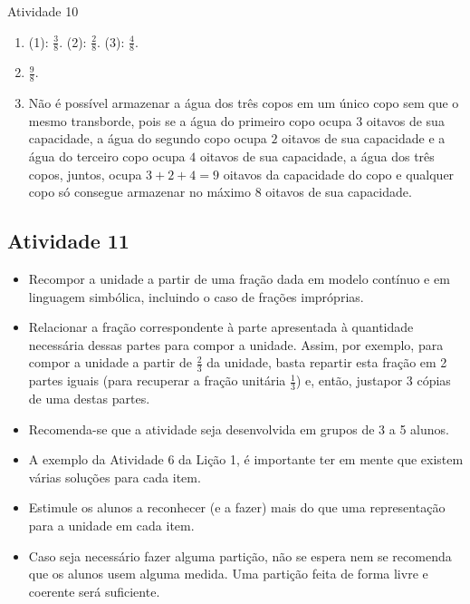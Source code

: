 \begin{multicols}{2}
\begin{resposta*}{Atividade 10}
\begin{enumerate} [\quad a)] %
    \item       (1):       $\frac{3}{8}$. (2):       $\frac{2}{8}$. (3):       $\frac{4}{8}$.
    \item             $\frac{9}{8}$.
    \item       Não é possível armazenar a água dos três copos em um único copo sem que o mesmo transborde, pois se a água do primeiro copo ocupa       $3$ oitavos de sua capacidade, a água do segundo copo ocupa       $2$ oitavos de sua capacidade e a água do terceiro copo ocupa       $4$ oitavos de sua capacidade, a água dos três copos, juntos, ocupa       $3 + 2 + 4 = 9$ oitavos da capacidade do copo e qualquer copo só consegue armazenar  no máximo $8$ oitavos de sua capacidade.
\end{enumerate} %

\end{resposta*}

\newpage

\subsection{Atividade 11}

   \vspace{.1cm}

  \begin{itemize} %
    \item       Recompor a unidade a partir de uma fração dada em modelo contínuo e em linguagem simbólica, incluindo o caso de frações impróprias.
    \item       Relacionar a fração correspondente à parte apresentada à quantidade necessária dessas partes para compor a unidade. Assim, por exemplo, para compor a unidade a partir de       $\frac{2}{3}$ da unidade, basta repartir esta fração em 2 partes iguais (para recuperar a fração unitária       $\frac{1}{3}$) e, então, justapor 3 cópias de uma destas partes.
\end{itemize} %

  \vspace{.1cm} \vspace{.1cm}

  \begin{itemize} %
    \item       Recomenda-se que a atividade seja desenvolvida em grupos de 3 a 5 alunos.
    \item       A exemplo da Atividade 6 da Lição 1, é importante ter em mente que existem várias soluções para cada item.
    \item       Estimule os alunos a reconhecer (e a fazer) mais do que uma representação para a unidade em cada item.
    \item       Caso seja necessário fazer alguma partição, não se espera nem se recomenda que os alunos usem alguma medida. Uma partição feita de forma livre e coerente será suficiente.
\end{itemize} %


\end{multicols}
